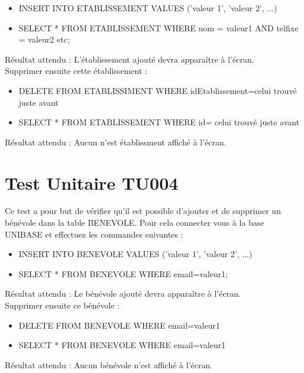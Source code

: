 	\begin{itemize}
		\item INSERT INTO ETABLISSEMENT VALUES ('valeur 1', 'valeur 2', ...)
		\item SELECT * FROM ETABLISSEMENT WHERE nom = valeur1 AND telfixe = valeur2 etc;
	\end{itemize}
	
	Résultat attendu : L'établissement ajouté devra apparaître à l'écran. \\
	
	Supprimer ensuite cette établissement : \\
	
	\begin{itemize}
		\item DELETE FROM ETABLISSIMENT WHERE idEtablissement=celui trouvé juste avant
		\item SELECT * FROM ETABLISSEMENT WHERE id= celui trouvé juste avant
	\end{itemize}	 
	
	Résultat attendu : Aucun n'est établissment affiché à l'écran.
	
\section{Test Unitaire TU004}
	Ce test a pour but de vérifier qu'il est possible d'ajouter et de supprimer un bénévole dans la table BENEVOLE. Pour cela connecter vous à la base UNIBASE et effectuez les commandes suivantes : \\
	
	\begin{itemize}
		\item INSERT INTO BENEVOLE VALUES ('valeur 1', 'valeur 2', ...)
		\item SELECT * FROM BENEVOLE WHERE email=valeur1;
	\end{itemize}
	
	Résultat attendu : Le bénévole ajouté devra apparaître à l'écran. \\
	
	Supprimer ensuite ce bénévole : \\
	
	\begin{itemize}
		\item DELETE FROM BENEVOLE WHERE email=valeur1
		\item SELECT * FROM BENEVOLE WHERE email=valeur1
	\end{itemize}	 
	
	Résultat attendu : Aucun bénévole n'est affiché à l'écran.
	
